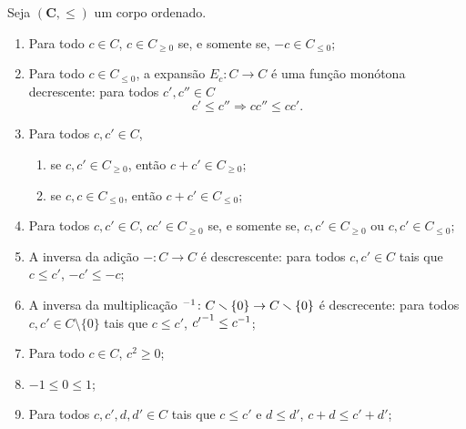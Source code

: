 \begin{proposition}
Seja $(\bm C,\leq)$ um corpo ordenado.
	\begin{enumerate}
	\item Para todo $c \in C$, $c \in C_{\geq 0}$ se, e somente se, $-c \in C_{\leq 0}$;

	\item Para todo $c \in C_{\leq 0}$, a expansão $E_c\colon C \to C$ é uma função monótona decrescente: para todos $c',c'' \in C$
		\begin{equation*}
		c' \leq c'' \Rightarrow cc'' \leq cc'.
		\end{equation*}
		
	\item Para todos $c,c' \in C$,
		\begin{enumerate}
		\item se $c,c' \in C_{\geq 0}$, então $c+c' \in C_{\geq 0}$;
		
		\item se $c,c \in C_{\leq 0}$, então $c+c' \in C_{\leq 0}$;
		
		\end{enumerate}
	
	\item Para todos $c,c' \in C$, $cc' \in C_{\geq 0}$ se, e somente se, $c,c' \in C_{\geq 0}$ ou $c,c' \in C_{\leq 0}$;
	
	\item A inversa da adição $-\colon C \to C$ é descrescente: para todos $c,c' \in C$ tais que $c \leq c'$, $-c' \leq -c$;
	
	\item A inversa da multiplicação ${}^{-1}\colon C \smallsetminus \{0\} \to C \smallsetminus \{0\}$ é descrecente: para todos $c,c' \in C \setminus \{0\}$ tais que $c \leq c'$, ${c'}^{-1} \leq c^{-1}$;
	
	\item Para todo $c \in C$, $c^2 \geq 0$;
	
	\item $-1 \leq 0 \leq 1$;
	
	\item Para todos $c,c',d,d' \in C$ tais que $c \leq c'$ e $d \leq d'$, $c+d \leq c'+d'$;
	\end{enumerate}
\end{proposition}
